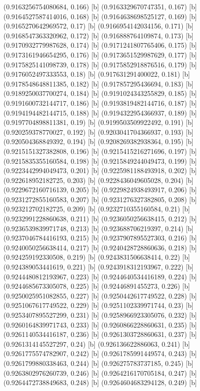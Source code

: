 {{{(0.9163256754080684, 0.166) [b] 
(0.9163329670747351, 0.167) [b] 
(0.9164527587414016, 0.168) [b] 
(0.9164638698525127, 0.169) [b] 
(0.9165270642969572, 0.17) [b] 
(0.9166954142034156, 0.171) [b] 
(0.9168547363320962, 0.172) [b] 
(0.916888764109874, 0.173) [b] 
(0.9170932779987628, 0.174) [b] 
(0.9171241807765406, 0.175) [b] 
(0.9173161946654295, 0.176) [b] 
(0.9173651529987629, 0.177) [b] 
(0.9175825141098739, 0.178) [b] 
(0.9175852918876516, 0.179) [b] 
(0.9176052497333553, 0.18) [b] 
(0.917631291400022, 0.181) [b] 
(0.9178548648811385, 0.182) [b] 
(0.917857295436694, 0.183) [b] 
(0.9189250037700274, 0.184) [b] 
(0.9191024343255829, 0.185) [b] 
(0.9191600732144717, 0.186) [b] 
(0.9193819482144716, 0.187) [b] 
(0.9194194482144715, 0.188) [b] 
(0.9194322954366937, 0.189) [b] 
(0.9197704898811381, 0.19) [b] 
(0.9199503509922492, 0.191) [b] 
(0.920259378770027, 0.192) [b] 
(0.9203041704366937, 0.193) [b] 
(0.920504368849392, 0.194) [b] 
(0.9208269382938364, 0.195) [b] 
(0.9215151327382808, 0.196) [b] 
(0.9215415216271696, 0.197) [b] 
(0.9215835355160584, 0.198) [b] 
(0.9215849244049473, 0.199) [b] 
(0.9223442994049473, 0.201) [b] 
(0.9225981188493918, 0.202) [b] 
(0.922618952182725, 0.203) [b] 
(0.9228436049605028, 0.204) [b] 
(0.9229672160716139, 0.205) [b] 
(0.9229824938493917, 0.206) [b] 
(0.9231272855160583, 0.207) [b] 
(0.9231276327382805, 0.208) [b] 
(0.923212702182725, 0.209) [b] 
(0.9232710355160584, 0.21) [b] 
(0.9232991228860638, 0.211) [b] 
(0.9236050256638415, 0.212) [b] 
(0.9236539839971748, 0.213) [b] 
(0.923688706219397, 0.214) [b] 
(0.9237046784416193, 0.215) [b] 
(0.9237907895527303, 0.216) [b] 
(0.9240050256638414, 0.217) [b] 
(0.9240428728860636, 0.218) [b] 
(0.924259192330508, 0.219) [b] 
(0.9243831506638414, 0.22) [b] 
(0.924389053441619, 0.221) [b] 
(0.9243918312193967, 0.222) [b] 
(0.9244480812193967, 0.223) [b] 
(0.9244640534416189, 0.224) [b] 
(0.9244685673305078, 0.225) [b] 
(0.92446891455273, 0.226) [b] 
(0.9250025951082855, 0.227) [b] 
(0.9250442617749522, 0.228) [b] 
(0.9251067617749522, 0.229) [b] 
(0.9251102339971744, 0.23) [b] 
(0.9253407895527299, 0.231) [b] 
(0.9258966923305076, 0.232) [b] 
(0.9260164839971743, 0.233) [b] 
(0.9260866228860631, 0.235) [b] 
(0.9261140534416187, 0.236) [b] 
(0.9261303728860631, 0.237) [b] 
(0.9261314145527297, 0.24) [b] 
(0.926136622886063, 0.241) [b] 
(0.9261775574782907, 0.242) [b] 
(0.9261785991449574, 0.243) [b] 
(0.9261799880338463, 0.244) [b] 
(0.926275783737185, 0.245) [b] 
(0.9263802976260739, 0.246) [b] 
(0.9264216170705184, 0.247) [b] 
(0.9264472738849683, 0.248) [b] 
(0.9264604683294128, 0.249) [b] 
}}}
